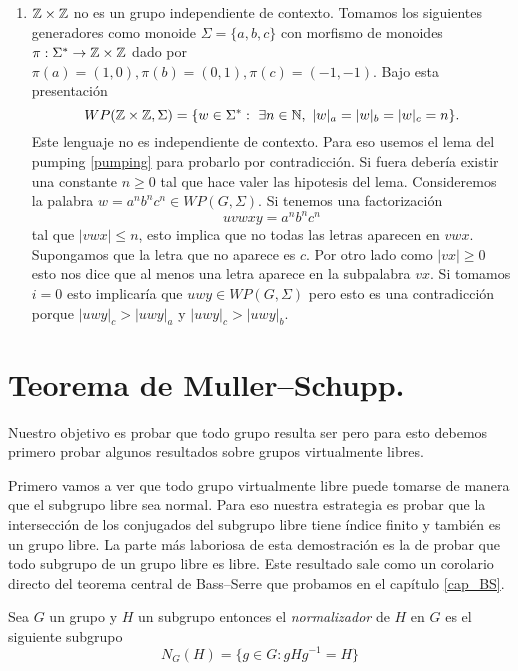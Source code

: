 \documentclass[tesis.tex]{subfiles}
\begin{document}
\begin{ej}
\begin{enumerate}[E1.]
		
		\item 	$\mathbb{Z} \times \mathbb{Z}$ no es un grupo independiente de contexto.
		Tomamos los siguientes generadores como monoide $\Sigma = \{ a,b,c \}$ con morfismo de monoides $\pi: \Sigma^* \to \mathbb{Z} \times \mathbb{Z}$ dado por $\pi(a)=(1,0), \pi(b)=(0,1), \pi(c)=(-1,-1)$.
		Bajo esta presentación 
		\[
		WP(\mathbb{Z} \times \mathbb{Z}, \Sigma) = \{ w \in \Sigma^*  : \ \exists n \in \mathbb{N}, \ |w|_a = |w|_b = |w|_c = n \}.
		\]
		Este lenguaje no es independiente de contexto.
		Para eso usemos el lema del pumping \ref{pumping} para probarlo por contradicción.
		Si fuera \ic debería existir una constante $n \ge 0$ tal que hace valer las hipotesis del lema.
		Consideremos la palabra $w = a^n b^n c^n \in WP(G, \Sigma)$.
		Si tenemos una factorización 
		\[
		uvwxy = a^nb^nc^n
		\]
		tal que $|vwx| \le n$, esto implica que no todas las letras aparecen en $vwx$.
		Supongamos que la letra que no aparece es $c$.
		Por otro lado como $|vx| \ge 0$ esto nos dice que al menos una letra aparece en la subpalabra $vx$.
		Si tomamos $i=0$ esto implicaría que $uwy \in WP(G,\Sigma)$ pero esto es una contradicción porque $|uwy|_{c} > |uwy|_{a}$ y $|uwy|_{c} > |uwy|_{b}$.
	\end{enumerate}
\end{ej}





\section{Teorema de Muller--Schupp.}\label{secc_teo_MS}

Nuestro objetivo es probar que todo grupo \vl resulta ser \ic pero para esto debemos primero probar algunos resultados sobre grupos virtualmente libres.

Primero vamos a ver que todo grupo virtualmente libre puede tomarse de manera que el subgrupo libre sea normal.
Para eso nuestra estrategia es probar que la intersección de los conjugados del subgrupo libre tiene índice finito y también es un grupo libre. 
La parte más laboriosa de esta demostración es la de probar que todo subgrupo de un grupo libre es libre.
Este resultado sale como un corolario directo del teorema central de Bass--Serre que probamos en el capítulo \ref{cap_BS}.
\begin{deff}
	Sea $G$ un grupo y $H$ un subgrupo entonces el \emph{normalizador} de $H$ en $G$ es el siguiente subgrupo
	\begin{equation*}
		N_G(H) = \{ g\in G : gHg^{-1} = H  \}
	\end{equation*}
\end{deff}
\end{document}
